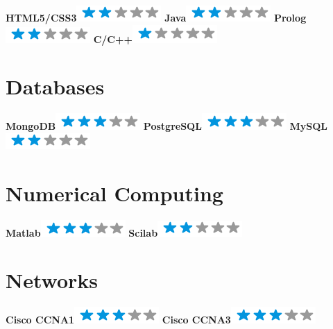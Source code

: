 \documentclass[]{friggeri-cv}
\begin{document}
\begin{aside}
    \textbf{HTML5/CSS3}\includegraphics[scale=0.40]{img/2stars.png}
    \textbf{Java}\includegraphics[scale=0.40]{img/2stars.png}
    \textbf{Prolog}\includegraphics[scale=0.40]{img/2stars.png}
    \textbf{C/C++}\includegraphics[scale=0.40]{img/1stars.png}
  \section{Databases}
    \textbf{MongoDB}\includegraphics[scale=0.40]{img/3stars.png}
    \textbf{PostgreSQL}\includegraphics[scale=0.40]{img/3stars.png}
    \textbf{MySQL}\includegraphics[scale=0.40]{img/2stars.png}
  \section{Numerical Computing}
    \textbf{Matlab}\includegraphics[scale=0.40]{img/3stars.png}
    \textbf{Scilab}\includegraphics[scale=0.40]{img/2stars.png}
  \section{Networks}
    \textbf{Cisco CCNA1}\includegraphics[scale=0.40]{img/3stars.png}
    \textbf{Cisco CCNA3}\includegraphics[scale=0.40]{img/3stars.png}

\end{aside}
\end{document}
